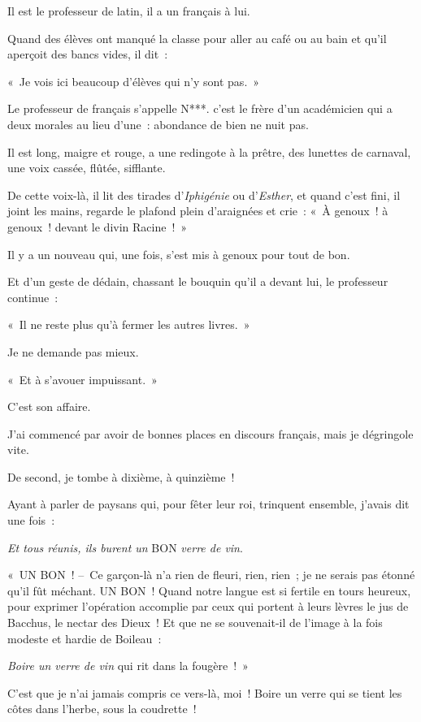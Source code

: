 \documentclass[french,twoside]{book} %
\begin{document}
Il est le professeur de latin, il a un français à lui.\par
Quand des élèves ont manqué la classe pour aller au café ou au bain et qu’il aperçoit des bancs vides, il dit :\par
« Je vois ici beaucoup d’élèves qui n’y sont pas. »\par
Le professeur de français s’appelle N***. c’est le frère d’un académicien qui a deux morales au lieu d’une : abondance de bien ne nuit pas.\par
Il est long, maigre et rouge, a une redingote à la prêtre, des lunettes de carnaval, une voix cassée, flûtée, sifflante.\par
De cette voix-là, il lit des tirades d’\emph{Iphigénie} ou d’\emph{Esther}, et quand c’est fini, il joint les mains, regarde le plafond plein d’araignées et crie : « À genoux ! à genoux ! devant le divin Racine ! »\par
Il y a un nouveau qui, une fois, s’est mis à genoux pour tout de bon.\par
Et d’un geste de dédain, chassant le bouquin qu’il a devant lui, le professeur continue :\par
« Il ne reste plus qu’à fermer les autres livres. »\par
Je ne demande pas mieux.\par
« Et à s’avouer impuissant. »\par
C’est son affaire.\par
\bigbreak
\noindent J’ai commencé par avoir de bonnes places en discours français, mais je dégringole vite.\par
De second, je tombe à dixième, à quinzième !\par
Ayant à parler de paysans qui, pour fêter leur roi, trinquent ensemble, j’avais dit une fois :\par
\emph{Et tous réunis, ils burent un} BON \emph{verre de vin}.\par
« UN BON ! – Ce garçon-là n’a rien de fleuri, rien, rien ; je ne serais pas étonné qu’il fût méchant. UN BON ! Quand notre langue est si fertile en tours heureux, pour exprimer l’opération accomplie par ceux qui portent à leurs lèvres le jus de Bacchus, le nectar des Dieux ! Et que ne se souvenait-il de l’image à la fois modeste et hardie de Boileau :\par
\emph{Boire un verre de vin} qui rit dans la fougère ! »\par
C’est que je n’ai jamais compris ce vers-là, moi ! Boire un verre qui se tient les côtes dans l’herbe, sous la coudrette !\par
\end{document}
